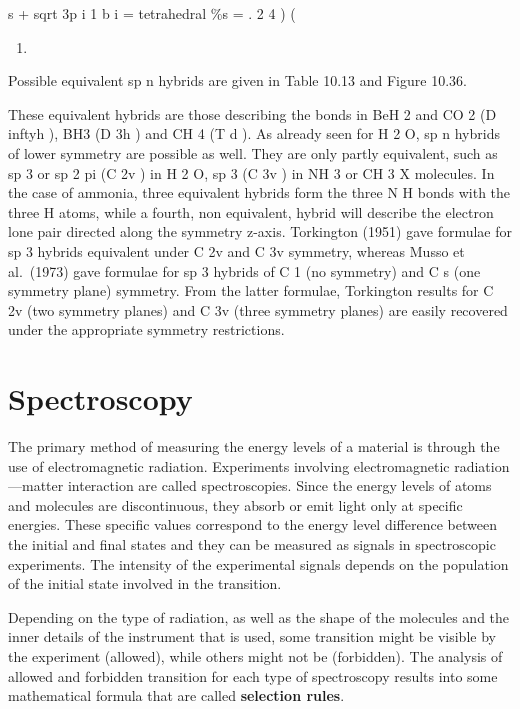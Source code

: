 \documentclass[
  9pt,
]{extbook}
\providecommand{\tightlist}{%
  \setlength{\itemsep}{0pt}\setlength{\parskip}{0pt}}
\theoremstyle{definition}
\theoremstyle{definition}
\theoremstyle{definition}
\theoremstyle{remark}
\begin{document}
s + sqrt 3p i 1 b i = tetrahedral \%s = . 2 4 ) (

\begin{enumerate}
\def\labelenumi{(\arabic{enumi})}
\setcounter{enumi}{294}
\tightlist
\item
\end{enumerate}

Possible equivalent sp n hybrids are given in Table 10.13 and Figure 10.36.

These equivalent hybrids are those describing the bonds in BeH 2 and CO 2 (D inftyh ), BH3 (D 3h ) and CH 4 (T d ). As already seen for H 2 O, sp n hybrids of lower symmetry are possible as well. They are only partly equivalent, such as sp 3 or sp 2 pi (C 2v ) in H 2 O, sp 3 (C 3v ) in NH 3 or CH 3 X molecules. In the case of ammonia, three equivalent hybrids form the three N H bonds with the three H atoms, while a fourth, non equivalent, hybrid will describe the electron lone pair directed along the symmetry z-axis. Torkington (1951) gave formulae for sp 3 hybrids equivalent under C 2v and C 3v symmetry, whereas Musso et al.~(1973) gave formulae for sp 3 hybrids of C 1 (no symmetry) and C s (one symmetry plane) symmetry. From the latter formulae, Torkington results for C 2v (two symmetry planes) and C 3v (three symmetry planes) are easily recovered under the appropriate symmetry restrictions.

\hypertarget{Spectroscopy}{%
\chapter{Spectroscopy}\label{Spectroscopy}}

The primary method of measuring the energy levels of a material is through the use of electromagnetic radiation. Experiments involving electromagnetic radiation---matter interaction are called spectroscopies. Since the energy levels of atoms and molecules are discontinuous, they absorb or emit light only at specific energies. These specific values correspond to the energy level difference between the initial and final states and they can be measured as signals in spectroscopic experiments. The intensity of the experimental signals depends on the population of the initial state involved in the transition.

Depending on the type of radiation, as well as the shape of the molecules and the inner details of the instrument that is used, some transition might be visible by the experiment (allowed), while others might not be (forbidden). The analysis of allowed and forbidden transition for each type of spectroscopy results into some mathematical formula that are called \textbf{selection rules}.
\end{document}
